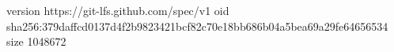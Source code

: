 version https://git-lfs.github.com/spec/v1
oid sha256:379daffcd0137d4f2b9823421bcf82c70e18bb686b04a5bea69a29fe64656534
size 1048672
